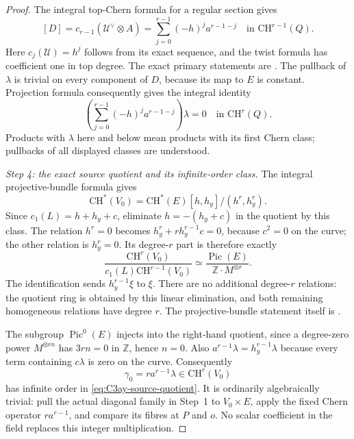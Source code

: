 \begin{proof}
The integral top-Chern formula for a regular section gives
\[
 [D]=c_{r-1}(\mathcal U^\vee\otimes A)
     =\sum_{j=0}^{r-1}(-h)^j a^{r-1-j}
                                      \quad\text{in }\mathrm{CH}^{r-1}(Q).
\]
Here $c_j(\mathcal U)=h^j$ follows from its exact sequence, and
the twist formula has coefficient one in top degree. The exact
primary statements are
\citet[Lemma 42.44.1 and Lemma 42.39.1]{D_StacksCriticalChern}.
The pullback of $\lambda$ is trivial on every component of $D$,
because its map to $E$ is constant. Projection formula consequently
gives the integral identity
\begin{equation}\label{eq:C3ay-chern-annihilator}
       \left(\sum_{j=0}^{r-1}(-h)^j a^{r-1-j}\right)\lambda=0
                                                 \quad\text{in }\mathrm{CH}^r(Q).
\end{equation}
Products with $\lambda$ here and below mean products with its first
Chern class; pullbacks of all displayed classes are understood.

\emph{Step 4: the exact source quotient and its infinite-order class.}
The integral projective-bundle formula gives
\[
 \mathrm{CH}^*(V_0)=
       \mathrm{CH}^*(E)[h,h_y]/(h^r,h_y^r).
\]
Since $c_1(L)=h+h_y+c$, eliminate $h=-(h_y+c)$ in the quotient
by this class. The relation $h^r=0$ becomes
$h_y^r+r h_y^{r-1}c=0$, because $c^2=0$ on the curve; the other
relation is $h_y^r=0$. Its degree-$r$ part is therefore exactly
\begin{equation}\label{eq:C3ay-source-quotient}
 \frac{\mathrm{CH}^r(V_0)}{c_1(L)\mathrm{CH}^{r-1}(V_0)}
       \simeq\frac{\operatorname{Pic}(E)}{\mathbb Z\cdot M^{\otimes r}}.
\end{equation}
The identification sends $h_y^{r-1}\xi$ to $\xi$.
There are no additional degree-$r$ relations: the quotient ring is
obtained by this linear elimination, and both remaining homogeneous
relations have degree $r$. The projective-bundle statement itself is
\citet[Lemma 42.36.2, Tag 02TX]{D_StacksCriticalChern}.

The subgroup $\operatorname{Pic}^0(E)$ injects into the right-hand
quotient, since a degree-zero power $M^{\otimes rn}$ has
$3rn=0$ in $\mathbb Z$, hence $n=0$. Also
$a^{r-1}\lambda=h_y^{r-1}\lambda$ because every term containing
$c\lambda$ is zero on the curve. Consequently
\[
               \gamma_0=r a^{r-1}\lambda\in\mathrm{CH}^r(V_0)
\]
has infinite order in \eqref{eq:C3ay-source-quotient}.
It is ordinarily algebraically trivial: pull the actual diagonal
family in Step~1 to $V_0\times E$, apply the fixed Chern operator
$r a^{r-1}$, and compare its fibres at $P$ and $o$.
No scalar coefficient in the field replaces this integer multiplication.


\end{proof}
